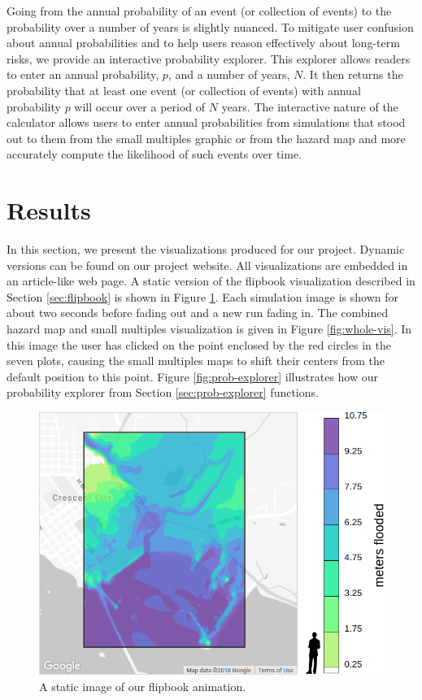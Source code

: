 \documentclass{vgtc}                          %
\begin{document}
Going from the annual probability of an event (or collection of events) to the probability over a number of years is slightly nuanced. To mitigate user confusion about annual probabilities and to help users reason effectively about long-term risks, we provide an interactive probability explorer. This explorer allows readers to enter an annual probability, $p$, and a number of years, $N$. It then returns the probability that at least one event (or collection of events) with annual probability $p$ will occur over a period of $N$ years. The interactive nature of the calculator allows users to enter annual probabilities from simulations that stood out to them from the small multiples graphic or from the hazard map and more accurately compute the likelihood of such events over time.

\section{Results}\label{sec:results}

In this section, we present the visualizations produced for our project. Dynamic versions can be found on our project website. All visualizations are embedded in an article-like web page. A static version of the flipbook visualization described in Section \ref{sec:flipbook} is shown in Figure \ref{fig:flipbook}. Each simulation image is shown for about two seconds before fading out and a new run fading in. The combined hazard map and small multiples visualization is given in Figure \ref{fig:whole-vis}. In this image the user has clicked on the point enclosed by the red circles in the seven plots, causing the small multiples maps to shift their centers from the default position to this point. Figure \ref{fig:prob-explorer} illustrates how our probability explorer from Section \ref{sec:prob-explorer} functions.


\begin{figure}
    \centering
    \includegraphics[width=\columnwidth]{pictures/flipbook.png}
    \caption{A static image of our flipbook animation.}
    \label{fig:flipbook}
\end{figure}
\end{document}
